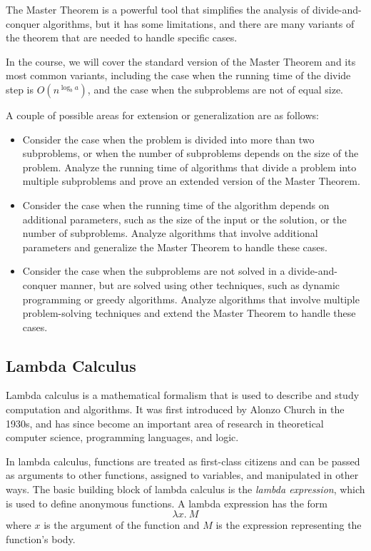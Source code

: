 \documentclass{article}
\begin{document}
    The Master Theorem is a powerful tool that simplifies the analysis of divide-and-conquer algorithms, but it has some limitations, and there are many variants of the theorem that are needed to handle specific cases.
    
    \vspace{3mm}
    In the course, we will cover the standard version of the Master Theorem and its most common variants, including the case when the running time of the divide step is $O(n^{\log_b a})$, and the case when the subproblems are not of equal size.
    
    \vspace{3mm}
    A couple of possible areas for extension or generalization are as follows:
    \begin{itemize}
    \item Consider the case when the problem is divided into more than two subproblems, or when the number of subproblems depends on the size of the problem. Analyze the running time of algorithms that divide a problem into multiple subproblems and prove an extended version of the Master Theorem.
    \item Consider the case when the running time of the algorithm depends on additional parameters, such as the size of the input or the solution, or the number of subproblems. Analyze algorithms that involve additional parameters and generalize the Master Theorem to handle these cases.
    \item Consider the case when the subproblems are not solved in a divide-and-conquer manner, but are solved using other techniques, such as dynamic programming or greedy algorithms. Analyze algorithms that involve multiple problem-solving techniques and extend the Master Theorem to handle these cases.
    \end{itemize}

\pagebreak 

\subsection*{Lambda Calculus}

Lambda calculus is a mathematical formalism that is used to describe and study computation and algorithms. It was first introduced by Alonzo Church in the 1930s, and has since become an important area of research in theoretical computer science, programming languages, and logic.

\vspace{3mm}
In lambda calculus, functions are treated as first-class citizens and can be passed as arguments to other functions, assigned to variables, and manipulated in other ways. The basic building block of lambda calculus is the \textit{lambda expression}, which is used to define anonymous functions. A lambda expression has the form $$\lambda x.\ M$$ where $x$ is the argument of the function and $M$ is the expression representing the function's body.
\end{document}
